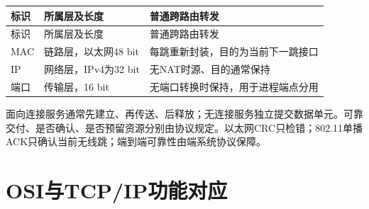 \par\smallskip
{\fontsize{9.3}{12}\selectfont\setlength{\tabcolsep}{2.5pt}\setlength{\LTleft}{0pt}\setlength{\LTright}{0pt}
\begin{longtable}{@{}>{\raggedright\arraybackslash}p{}>{\raggedright\arraybackslash}p{}>{\raggedright\arraybackslash}p{}@{}}
\toprule
标识 & 所属层及长度 & 普通跨路由转发 \\

\midrule\endfirsthead\toprule
标识 & 所属层及长度 & 普通跨路由转发 \\

\midrule\endhead\bottomrule\endfoot
MAC & 链路层，以太网48 bit & 每跳重新封装，目的为当前下一跳接口 \\

IP & 网络层，IPv4为32 bit & 无NAT时源、目的通常保持 \\

端口 & 传输层，16 bit & 无端口转换时保持，用于进程端点分用 \\

\end{longtable}}
\par\smallskip

面向连接服务通常先建立、再传送、后释放；无连接服务独立提交数据单元。可靠交付、是否确认、是否预留资源分别由协议规定。以太网CRC只检错；802.11单播ACK只确认当前无线跳；端到端可靠性由端系统协议保障。

\section{OSI与TCP/IP功能对应}\label{CN01-models}

